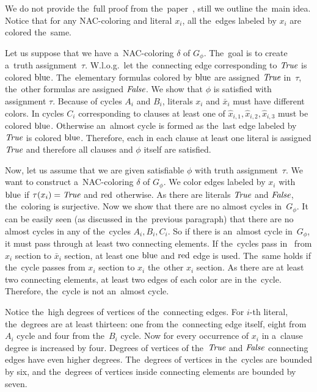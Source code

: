 We do not provide the~full proof from the~paper~\cite{np_complete},
still we outline the~main idea.
Notice that for any NAC-coloring and literal \( x_i \),
all the~edges labeled by \( x_i \) are colored the~same.

Let us suppose that we have a~NAC-coloring \( \delta \) of \( G_\phi \).
The~goal is to create a~truth assignment~\( \tau \).
W.l.o.g.\ let the~connecting edge corresponding to \( \textit{True} \) is colored \( \text{blue} \).
The~elementary formulas colored by \( \text{blue} \) are assigned \( \textit{True} \) in~\( \tau \),
the~other formulas are assigned \( \textit{False} \).
We show that \( \phi \) is satisfied with assignment \( \tau \).
Because of cycles \( A_i \) and \( B_i \), literals \( x_i \) and \( \bar{x}_i \)
must have different colors. In cycles \( C_i \) corresponding to clauses
at least one of \( \hat{x}_{i,1}, \hat{x}_{i,2}, \hat{x}_{i,3} \) must be colored \( \text{blue} \).
Otherwise an~almost cycle is formed as the~last edge labeled by \( \textit{True} \) is colored \( \text{blue} \).
Therefore, each in each clause at least one literal is assigned \( \textit{True} \)
and therefore all clauses and \( \phi \) itself are satisfied.

Now, let us assume that we are given satisfiable \( \phi \)
with truth assignment~\( \tau \).
We want to construct a~NAC-coloring \( \delta \) of \( G_\phi \).
We color edges labeled by \( x_i \) with \( \text{blue} \) if \( \tau(x_i) = \textit{True} \)
and \( \text{red} \) otherwise.
As there are literals \( \textit{True} \) and \( \textit{False} \), the~coloring is surjective.
Now we show that there are no almost cycles in~\( G_\phi \).
It can be easily seen (as discussed in the~previous paragraph)
that there are no almost cycles in any of the~cycles \( A_i, B_i, C_i \).
So if there is an~almost cycle in~\( G_\phi \), it must pass through
at least two connecting elements.
If the~cycles pass in~
from \( x_i \) section to \( \bar{x}_i \) section, at least one \( \text{blue} \)
and \( \text{red} \) edge is used. The~same holds if the~cycle passes
from \( x_i \) section to \( x_i \) the~other \( x_i \) section.
As there are at least two connecting elements, at least two edges of each color are in the~cycle.
Therefore, the~cycle is not an~almost cycle.

Notice the~high degrees of vertices of the~connecting edges.
For \( i \)-th literal, the~degrees are at least thirteen:
one from the~connecting edge itself,
eight from \( A_i \) cycle and four from the~\( B_i \) cycle.
Now for every occurrence of \( x_i \) in a~clause degree is increased by four.
%
Degrees of vertices of the~\( \textit{True} \) and \( \textit{False} \) connecting edges
have even higher degrees.
%
The~degrees of vertices in the~cycles are bounded by six,
and the~degrees of vertices inside connecting elements are bounded by seven.


